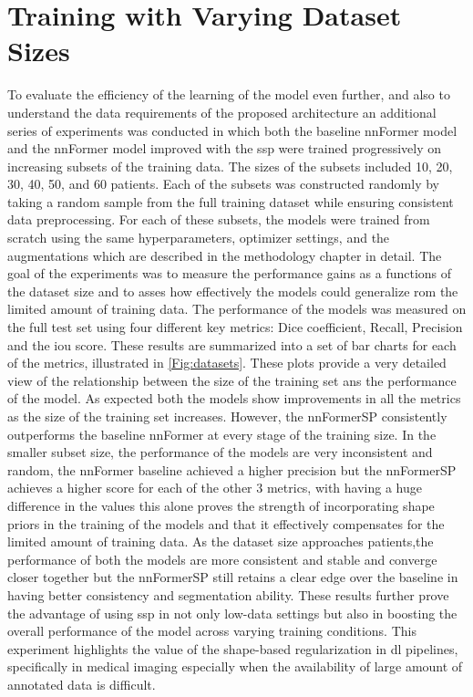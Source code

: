 \section{Training with Varying Dataset Sizes}
To evaluate the efficiency of the learning of the model even further, and also to understand the data requirements of the proposed architecture an additional series of experiments was conducted in which both the baseline nnFormer model and the nnFormer model improved with the \gls{ssp} were trained progressively on increasing subsets of the training data. The sizes of the subsets included 10, 20, 30, 40, 50, and 60 patients. Each of the subsets was constructed randomly by taking a random sample from the full training dataset while ensuring consistent data preprocessing. For each of these subsets, the models were trained from scratch using the same hyperparameters, optimizer settings, and the augmentations which are described in the methodology chapter in detail. The goal of the experiments was to measure the performance gains as a functions of the dataset size and to asses how effectively the models could generalize rom the limited amount of training data. The performance of the models was measured on the full test set using four different key metrics: Dice coefficient, Recall, Precision and the \gls{iou} score. These results are summarized into a set of bar charts for each of the metrics, illustrated in \cref{Fig:datasets}. These plots provide a very detailed view of the relationship between the size of the training set ans the performance of the model. As expected both the models show improvements in all the metrics as the size of the training set increases. However, the nnFormerSP consistently outperforms the baseline nnFormer at every stage of the training size. In the smaller subset size, the performance of the models are very inconsistent and random, the nnFormer baseline achieved a higher precision but the nnFormerSP achieves a higher score for each of the other 3 metrics, with having a huge difference in the values this alone proves the strength of incorporating shape priors in the training of the models and that it effectively compensates for the limited amount of training data. As the dataset size approaches patients,the performance of both the models are more consistent and stable and converge closer together but the nnFormerSP still retains a clear edge over the baseline in having better consistency and segmentation ability. These results further prove the advantage of using \gls{ssp} in not only low-data settings but also in boosting the overall performance of the model across varying training conditions. This experiment highlights the value of the shape-based regularization in \gls{dl} pipelines, specifically in medical imaging especially when the availability of large amount of annotated data is difficult.

